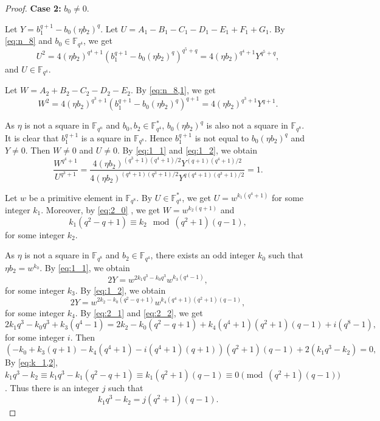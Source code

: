\documentclass{amsart}
\theoremstyle{plain}
\theoremstyle{definition}
\newcommand{\F}{\mathbb F}
\newcommand{\fqn}{\mathbb{F}_{q^n}}
\begin{document}
\begin{proof}
		\medskip
		
		\noindent\textbf{Case 2:} $b_0\neq0$.
		
		Let $Y=b_1^{q+1}-b_0(\eta b_2)^{q}$.
		Let $U=A_1-B_1-C_1-D_1-E_1+F_1+G_1$.
		By  \eqref{eq:n_8} and $b_0\in\F_{q^4}$, we get 
		\begin{equation}\label{eq:1_1}
			U^2=4(\eta b_2)^{q^4+1}(b_1^{q+1}-b_0(\eta b_2)^{q})^{q^5+q}=	4(\eta b_2)^{q^4+1}Y^{q^5+q},
		\end{equation}
		and $U\in\F_{q^4}$.
		
		Let $W=A_2+B_2-C_2-D_2-E_2$. By \eqref{eq:n_8,1}, we get
		\begin{equation}\label{eq:1_2}
			W^2=4(\eta b_2)^{q^3+1}(b_1^{q+1}-b_0(\eta b_2)^{q})^{q+1}=4(\eta b_2)^{q^3+1}Y^{q+1}.
		\end{equation}
		
		As $\eta$ is not a square in $\fqn$ and $b_0,b_2\in\F_{q^4}^*$,  $b_0(\eta b_2)^{q} $ is also not a square in $\F_{q^8}$. It is clear that $b_1^{q+1}$ is a square in $\F_{q^8}$. Hence $b_1^{q+1}$ is not equal to $b_0(\eta b_2)^{q} $ and $Y\neq 0$. 
		Then $W\neq 0$ and $U\neq 0$. 
		By \eqref{eq:1_1} and \eqref{eq:1_2}, we obtain
		\begin{equation}	\label{eq:2_0}
			\frac{W^{q^4+1}}{U^{q^3+1}}=\frac{	4(\eta b_2)^{(q^3+1)(q^4+1)/2}Y^{(q+1)(q^4+1)/2}}{	4(\eta b_2)^{(q^4+1)(q^3+1)/2}Y^{q(q^4+1)(q^3+1)/2}}=1.
		\end{equation}
		
		Let $w$ be a primitive element in $\F_{q^8}$. By  $U\in\F_{q^4}^*$, we get \(U=w^{k_1(q^4+1)}\) for some integer $k_1$. Moreover, by \eqref{eq:2_0} , we get \(W=w^{k_2(q+1)}\) and 
		\begin{equation}\label{eq:k_1,2}
			k_1(q^2-q+1)\equiv k_2\mod(q^2+1)(q-1),
		\end{equation} for some integer $k_2$.
		
		As $\eta$ is not a square in $\F_{q^8}$ and $b_2\in\F_{q^4}$, there exists an odd integer $k_0$ such that $\eta b_2=w^{k_0}$. By \eqref{eq:1_1}, we obtain 
		\begin{equation}\label{eq:2_1}
			2Y=w^{2k_1q^3-k_0q^3}w^{k_3(q^4-1)},
		\end{equation}
		for some integer $k_3$.
		By \eqref{eq:1_2}, we obtain 
		\begin{equation}\label{eq:2_2}
			2Y=w^{2k_2-k_0(q^2-q+1)}w^{k_4(q^4+1)(q^2+1)(q-1)},
		\end{equation}
		for some integer $k_4$.
		By \eqref{eq:2_1} and \eqref{eq:2_2}, we get 
		$$2k_1q^3-k_0q^3+k_3(q^4-1)=2k_2-k_0(q^2-q+1)+k_4(q^4+1)(q^2+1)(q-1)+i(q^8-1),$$
		for some integer $i$. Then  
		\begin{equation}\label{eq:2_3}
			\left(-k_0+k_3(q+1)-k_4(q^4+1)-i(q^4+1)(q+1)\right)(q^2+1)(q-1)+2(k_1q^3-k_2)=0,
		\end{equation}
		By \eqref{eq:k_1,2},  $k_1q^3-k_2\equiv k_1q^3- k_1(q^2-q+1)\equiv k_1(q^2+1)(q-1) \equiv 0 \pmod{(q^2+1)(q-1)}$. Thus there is an integer $j$ such that
		\[
		k_1q^3-k_2=j(q^2+1)(q-1).
		\]
		

\end{proof}
\end{document}
